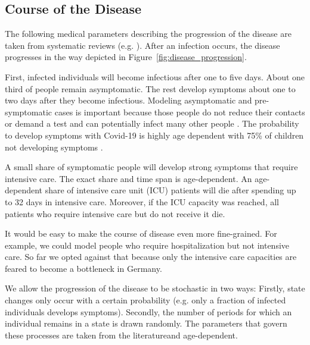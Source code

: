 \subsection{Course of the Disease}
\label{sub:disease_progression}

The following medical parameters describing the progression of the disease are taken from
systematic reviews (e.g. \citet{He2020}). After an infection occurs, the disease
progresses in the way depicted in Figure~\ref{fig:disease_progression}.


First, infected individuals will become infectious after one to five days. About one
third of people remain asymptomatic. The rest develop symptoms about one to two days
after they become infectious. Modeling asymptomatic and pre-symptomatic cases is
important because those people do not reduce their contacts or demand a test and can
potentially infect many other people \citep{Donsimoni2020}. The probability to develop
symptoms with Covid-19 is highly age dependent with 75\% of children not developing
symptoms \citep{Davies2020}.

A small share of symptomatic people will develop strong symptoms that require intensive
care. The exact share and time span is age-dependent. An age-dependent share of intensive
care unit (ICU) patients will die after spending up to 32 days in intensive care.
Moreover, if the ICU capacity was reached, all patients who require intensive care but do
not receive it die.

It would be easy to make the course of disease even more fine-grained. For example, we
could model people who require hospitalization but not intensive care. So far we opted
against that because only the intensive care capacities are feared to become a bottleneck
in Germany.

We allow the progression of the disease to be stochastic in two ways: Firstly, state
changes only occur with a certain probability (e.g. only a fraction of infected
individuals develops symptoms). Secondly, the number of periods for which an individual
remains in a state is drawn randomly. The parameters that govern these processes are
taken from the literature\footnotemark and age-dependent.

